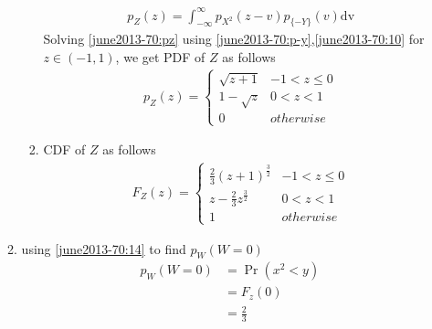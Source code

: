 \begin{enumerate}
\begin{enumerate}
\begin{enumerate}
\begin{align}
p_Z(z)=\int_{- \infty}^{\infty} p_{X^2}(z-v)p_{\{-Y\}}(v) \mathrm{dv} \label{june2013-70:pz}
\end{align}
Solving \eqref{june2013-70:pz} using \eqref{june2013-70:p-y},\eqref{june2013-70:10} for $z \in (-1,1)$, we get PDF of $Z$ as follows
\begin{align}
p_{Z}(z)  = 
\begin{cases}
      \sqrt{z+1} & -1 < z \leq 0 \\
      1-\sqrt{z} & 0 < z <1 \\
      0 & otherwise 
\end{cases} \label{june2013-70:13}
\end{align}
\item CDF of $Z$ as follows
\begin{align}
F_{Z}(z)  = 
\begin{cases}
      \frac{2}{3}{(z+1)}^\frac{3}{2} & -1 < z \leq 0 \\
      z-\frac{2}{3}{z}^\frac{3}{2} & 0 < z < 1 \\
      1 & otherwise
\end{cases} \label{june2013-70:14}
\end{align}

\end{enumerate}

\item using \eqref{june2013-70:14} to find $p_W(W=0)$
\begin{align}
p_W(W=0) &=\Pr(x^2 <y) \\
         &=F_z(0) \\
         &=\frac{2}{3} \label{june2013-70:15}
\end{align}


\end{enumerate}
\end{enumerate}
